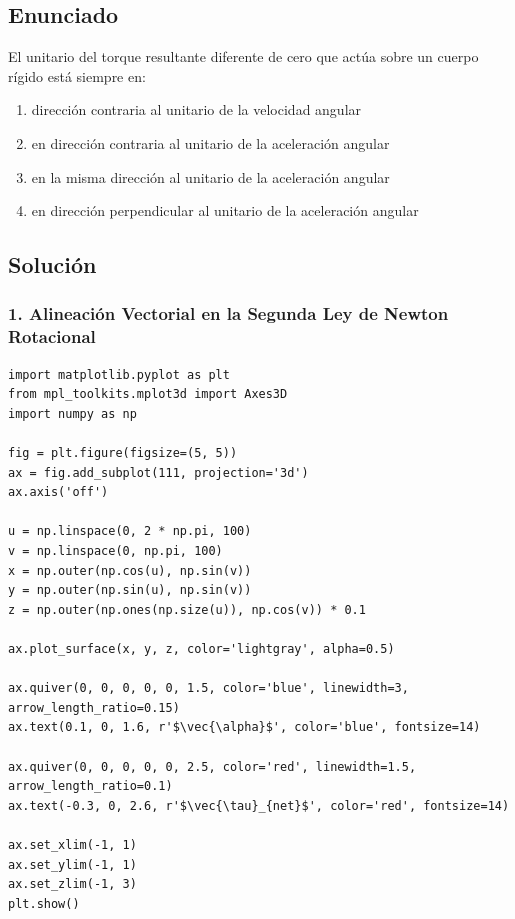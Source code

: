 \documentclass[12pt, a4paper]{article}
\begin{document}
\newpage

\subsection*{Enunciado}
El unitario del torque resultante diferente de cero que actúa sobre un cuerpo rígido está siempre en:
\begin{enumerate}[label=\alph*)]
    \item dirección contraria al unitario de la velocidad angular
    \item en dirección contraria al unitario de la aceleración angular
    \item en la misma dirección al unitario de la aceleración angular
    \item en dirección perpendicular al unitario de la aceleración angular
\end{enumerate}

\subsection*{Solución}

\subsubsection*{1. Alineación Vectorial en la Segunda Ley de Newton Rotacional}


\begin{verbatim}
import matplotlib.pyplot as plt
from mpl_toolkits.mplot3d import Axes3D
import numpy as np

fig = plt.figure(figsize=(5, 5))
ax = fig.add_subplot(111, projection='3d')
ax.axis('off')

u = np.linspace(0, 2 * np.pi, 100)
v = np.linspace(0, np.pi, 100)
x = np.outer(np.cos(u), np.sin(v))
y = np.outer(np.sin(u), np.sin(v))
z = np.outer(np.ones(np.size(u)), np.cos(v)) * 0.1

ax.plot_surface(x, y, z, color='lightgray', alpha=0.5)

ax.quiver(0, 0, 0, 0, 0, 1.5, color='blue', linewidth=3, arrow_length_ratio=0.15)
ax.text(0.1, 0, 1.6, r'$\vec{\alpha}$', color='blue', fontsize=14)

ax.quiver(0, 0, 0, 0, 0, 2.5, color='red', linewidth=1.5, arrow_length_ratio=0.1)
ax.text(-0.3, 0, 2.6, r'$\vec{\tau}_{net}$', color='red', fontsize=14)

ax.set_xlim(-1, 1)
ax.set_ylim(-1, 1)
ax.set_zlim(-1, 3)
plt.show()
\end{verbatim}
\end{document}
